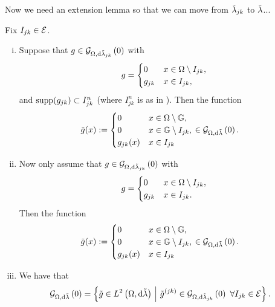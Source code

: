 Now we need an extension lemma so that we can move from $\tilde{\lambda}_{jk}$ to $\tilde{\lambda}$...
\begin{prop} \label{prop:SI-GradZeroExtension}
	Fix $I_{jk}\in\mathcal{E}$.
	\begin{enumerate}[(i)]
		\item Suppose that $g\in\mathcal{G}_{ \Omega, \mathrm{d}\tilde{\lambda}_{jk}}\left( 0 \right)$ with
		\begin{align*}
			g = \begin{cases} 0 & x\in\Omega\setminus I_{jk}, \\ g_{jk} & x\in I_{jk}, \end{cases}
		\end{align*}
		and $\mathrm{supp}(g_{jk})\subset I_{jk}^n$ (where $I_{jk}^n$ is as in ).
		Then the function
		\begin{align*}
			\tilde{g}(x) &:= \begin{cases} 0 & x\in\Omega\setminus\mathbb{G}, \\ 0 & x\in\mathbb{G}\setminus I_{jk}, \\ g_{jk}(x) & x\in I_{jk} \end{cases}
			\in\mathcal{G}_{ \Omega, \mathrm{d}\tilde{\lambda}}\left( 0 \right).
		\end{align*}
		\item Now only assume that $g\in\mathcal{G}_{ \Omega, \mathrm{d}\tilde{\lambda}_{jk}}\left( 0 \right)$ with
		\begin{align*}
			g = \begin{cases} 0 & x\in\Omega\setminus I_{jk}, \\ g_{jk} & x\in I_{jk}. \end{cases}
		\end{align*}
		Then the function
		\begin{align*}
			\tilde{g}(x) &:= \begin{cases} 0 & x\in\Omega\setminus\mathbb{G}, \\ 0 & x\in\mathbb{G}\setminus I_{jk}, \\ g_{jk}(x) & x\in I_{jk} \end{cases}
			\in\mathcal{G}_{ \Omega, \mathrm{d}\tilde{\lambda}}\left( 0 \right).
		\end{align*}
		\item We have that
		\begin{align*}
			\mathcal{G}_{ \Omega, \mathrm{d}\tilde{\lambda}}\left( 0 \right) &= \left\{  \tilde{g}\in L^{2}\left( \Omega,\mathrm{d}\tilde{\lambda} \right) \ \middle\vert \  \tilde{g}^{(jk)}\in\mathcal{G}_{ \Omega, \mathrm{d}\tilde{\lambda}_{jk}}\left( 0 \right) \ \forall I_{jk}\in\mathcal{E}  \right\}.
		\end{align*}
	\end{enumerate}
\end{prop}
